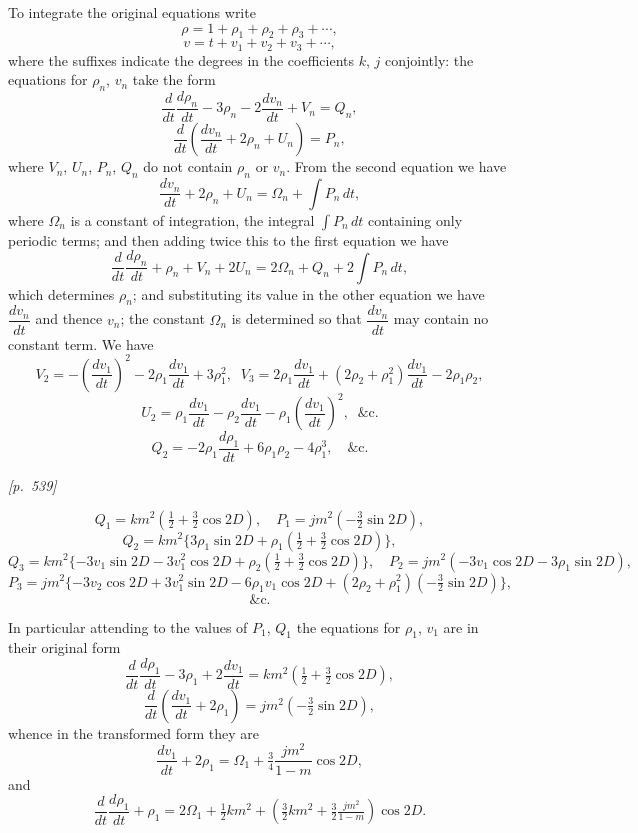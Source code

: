 \documentclass[11pt]{article}
\begin{document}
To integrate the original equations write
\[
\rho=1+\rho_1+\rho_2+\rho_3+\cdots,
\]
\[
v=t+v_1+v_2+v_3+\cdots,
\]
where the suffixes indicate the degrees in the coefficients $k$, $j$
conjointly: the equations for $\rho_n$, $v_n$ take the form
\[
\frac{d}{dt}\frac{d\rho_n}{dt}-3\rho_n-2\frac{dv_n}{dt}+V_n=Q_n,
\]
\[
\frac{d}{dt}\left(\frac{dv_n}{dt}+2\rho_n+U_n\right)=P_n,
\]
where $V_n$, $U_n$, $P_n$, $Q_n$ do not contain $\rho_n$ or $v_n$. From
the second equation we have
\[
\frac{dv_n}{dt}+2\rho_n+U_n=\Omega_n+\int P_n\,dt,
\]
where $\Omega_n$ is a constant of integration, the integral $\int P_n\,dt$
containing only periodic terms; and then adding twice this to the first
equation we have
\[
\frac{d}{dt}\frac{d\rho_n}{dt}+\rho_n+V_n+2U_n=2\Omega_n+Q_n+2\int P_n\,dt,
\]
which determines $\rho_n$; and substituting its value in the other
equation we have $\dfrac{dv_n}{dt}$ and thence $v_n$; the constant
$\Omega_n$ is determined so that $\dfrac{dv_n}{dt}$ may contain no
constant term. We have
\[
V_2=-\left(\frac{dv_1}{dt}\right)^2-2\rho_1\frac{dv_1}{dt}+3\rho_1^2,\;\; V_3=2\rho_1\frac{dv_1}{dt}+(2\rho_2+\rho_1^2)\frac{dv_1}{dt}-2\rho_1\rho_2,
\]
\[
U_2=\rho_1\frac{dv_1}{dt}-\rho_2\frac{dv_1}{dt}-\rho_1\left(\frac{dv_1}{dt}\right)^2,\;\;\text{\&c.}
\]
\[
Q_2=-2\rho_1\frac{d\rho_1}{dt}+6\rho_1\rho_2-4\rho_1^3,\quad\text{\&c.}
\]


\newpage
\noindent\textit{[p.~539]}

\medskip

\[
Q_1=km^2(\tfrac{1}{2}+\tfrac{3}{2}\cos 2D),\quad P_1=jm^2(-\tfrac{3}{2}\sin 2D),
\]
\[
Q_2=km^2\{3\rho_1\sin 2D+\rho_1(\tfrac{1}{2}+\tfrac{3}{2}\cos 2D)\},
\]
\[
Q_3=km^2\{-3v_1\sin 2D-3v_1^2\cos 2D+\rho_2(\tfrac{1}{2}+\tfrac{3}{2}\cos 2D)\},\quad P_2=jm^2(-3v_1\cos 2D-3\rho_1\sin 2D),
\]
\[
P_3=jm^2\{-3v_2\cos 2D+3v_1^2\sin 2D-6\rho_1v_1\cos 2D+(2\rho_2+\rho_1^2)(-\tfrac{3}{2}\sin 2D)\},
\]
\[
\text{\&c.}
\]

In particular attending to the values of $P_1$, $Q_1$ the equations for
$\rho_1$, $v_1$ are in their original form
\[
\frac{d}{dt}\frac{d\rho_1}{dt}-3\rho_1+2\frac{dv_1}{dt}=km^2(\tfrac{1}{2}+\tfrac{3}{2}\cos 2D),
\]
\[
\frac{d}{dt}\left(\frac{dv_1}{dt}+2\rho_1\right)=jm^2(-\tfrac{3}{2}\sin 2D),
\]
whence in the transformed form they are
\[
\frac{dv_1}{dt}+2\rho_1=\Omega_1+\tfrac{3}{4}\frac{jm^2}{1-m}\cos 2D,
\]
and
\[
\frac{d}{dt}\frac{d\rho_1}{dt}+\rho_1=2\Omega_1+\tfrac{1}{2}km^2+(\tfrac{3}{2}km^2+\tfrac{3}{2}\tfrac{jm^2}{1-m})\cos 2D.
\]
\end{document}
